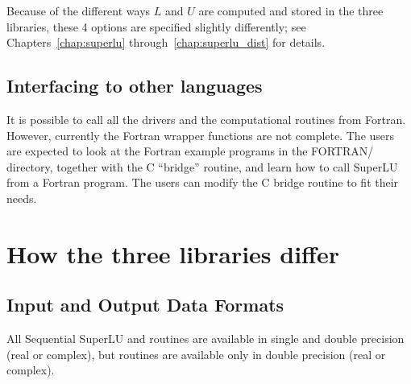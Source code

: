 Because of the different ways $L$ and $U$ are computed and
stored in the three libraries, these 4 options are specified slightly
differently; see Chapters~\ref{chap:superlu} through~\ref{chap:superlu_dist}
for details.

\subsection{Interfacing to other languages}

It is possible to call all the drivers and the computational routines
from Fortran. However, currently the Fortran wrapper functions are not
complete.  The users are expected to look at the Fortran example programs
in the FORTRAN/ directory, together with the C ``bridge''
routine, and learn how to call SuperLU from a Fortran program.
The users can modify the C bridge routine to fit their needs.


\section{How the three libraries differ}
\label{sec:Differences}

\subsection{Input and Output Data Formats}

All Sequential SuperLU and {\superlumt} routines are available in 
single and double precision (real or complex), but {\superlud} routines
are available only in double precision (real or complex).

